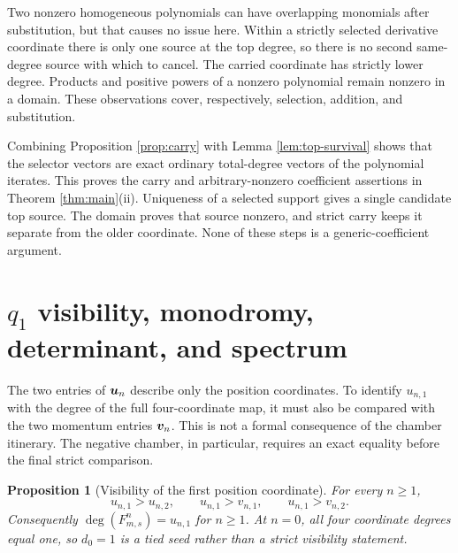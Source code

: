 \documentclass[11pt]{article}
\newtheorem{proposition}[theorem]{Proposition}
\theoremstyle{definition}
\theoremstyle{remark}
\begin{document}
Two nonzero homogeneous polynomials can have overlapping monomials after
substitution, but that causes no issue here.  Within a strictly selected
derivative coordinate there is only one source at the top degree, so there is
no second same-degree source with which to cancel.  The carried coordinate
has strictly lower degree.  Products and positive powers of a nonzero
polynomial remain nonzero in a domain.  These observations cover,
respectively, selection, addition, and substitution.

Combining Proposition \ref{prop:carry} with Lemma
\ref{lem:top-survival} shows that the selector vectors are exact ordinary
total-degree vectors of the polynomial iterates.  This proves the carry and
arbitrary-nonzero coefficient assertions in Theorem \ref{thm:main}(ii).
Uniqueness of a selected support gives a single candidate top source.  The
domain proves that source nonzero, and strict carry keeps it separate from
the older coordinate.  None of these steps is a generic-coefficient
argument.

\section{\texorpdfstring{\(q_1\)}{q1} visibility, monodromy, determinant, and spectrum}
\label{sec:visibility}

The two entries of \(\boldsymbol{u}_n\) describe only the position coordinates.  To
identify \(u_{n,1}\) with the degree of the full four-coordinate map, it must
also be compared with the two momentum entries \(\boldsymbol{v}_n\).  This is not a
formal consequence of the chamber itinerary.  The negative chamber, in
particular, requires an exact equality before the final strict comparison.

\begin{proposition}[Visibility of the first position coordinate]
\label{prop:q1-visibility}
For every \(n\geq1\),
\[
u_{n,1}>u_{n,2},\qquad
u_{n,1}>v_{n,1},\qquad
u_{n,1}>v_{n,2}.
\]
Consequently \(\deg(F_{m,s}^n)=u_{n,1}\) for \(n\geq1\).  At \(n=0\), all
four coordinate degrees equal one, so \(d_0=1\) is a tied seed rather than a
strict visibility statement.
\end{proposition}
\end{document}

